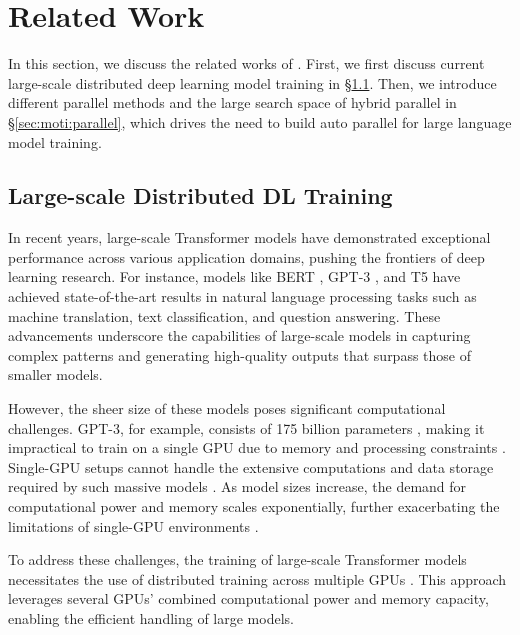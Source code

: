 \section{Related Work}\label{sec:moti}

In this section, we discuss the related works of \sysname.
First, we first discuss current large-scale distributed deep learning model training in \S\ref{sec:moti:large}.
Then, we introduce different parallel methods and the large search space of hybrid parallel in \S\ref{sec:moti:parallel}, which drives the need to build auto parallel for large language model training.

\subsection{Large-scale Distributed DL Training}\label{sec:moti:large}

\par In recent years, large-scale Transformer models have demonstrated exceptional performance across various application domains, pushing the frontiers of deep learning research. For instance, models like BERT \cite{devlin2018bert}, GPT-3 \cite{achiam2023gpt}, and T5 \cite{ni2021sentence} have achieved state-of-the-art results in natural language processing tasks such as machine translation, text classification, and question answering. These advancements underscore the capabilities of large-scale models in capturing complex patterns and generating high-quality outputs that surpass those of smaller models.

\par However, the sheer size of these models poses significant computational challenges. GPT-3, for example, consists of 175 billion parameters \cite{achiam2023gpt}, making it impractical to train on a single GPU due to memory and processing constraints \cite{hoffmann2022empirical}. Single-GPU setups cannot handle the extensive computations and data storage required by such massive models \cite{hoffmann2022empirical}. As model sizes increase, the demand for computational power and memory scales exponentially, further exacerbating the limitations of single-GPU environments \cite{geiping2023cramming}.

\par To address these challenges, the training of large-scale Transformer models necessitates the use of distributed training across multiple GPUs \cite{narayanan2021efficient, li2020pytorch, pipedream}. This approach leverages several GPUs' combined computational power and memory capacity, enabling the efficient handling of large models. 


